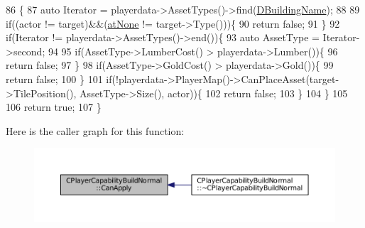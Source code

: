 \begin{DoxyCode}
86                                                                                                            
                                                        \{
87     \textcolor{keyword}{auto} Iterator = playerdata->AssetTypes()->find(\hyperlink{classCPlayerCapabilityBuildNormal_aae09d6cee5f8e201a0139c9065a5577c}{DBuildingName});
88     
89     \textcolor{keywordflow}{if}((actor != target)&&(\hyperlink{GameDataTypes_8h_a5600d4fc433b83300308921974477feca82fb51718e2c00981a2d37bc6fe92593}{atNone} != target->Type()))\{
90         \textcolor{keywordflow}{return} \textcolor{keyword}{false};
91     \}
92     \textcolor{keywordflow}{if}(Iterator != playerdata->AssetTypes()->end())\{
93         \textcolor{keyword}{auto} AssetType = Iterator->second;
94 
95         \textcolor{keywordflow}{if}(AssetType->LumberCost() > playerdata->Lumber())\{
96             \textcolor{keywordflow}{return} \textcolor{keyword}{false};   
97         \}
98         \textcolor{keywordflow}{if}(AssetType->GoldCost() > playerdata->Gold())\{
99             \textcolor{keywordflow}{return} \textcolor{keyword}{false};   
100         \}
101         \textcolor{keywordflow}{if}(!playerdata->PlayerMap()->CanPlaceAsset(target->TilePosition(), AssetType->Size(), actor))\{
102             \textcolor{keywordflow}{return} \textcolor{keyword}{false};
103         \}
104     \}
105 
106     \textcolor{keywordflow}{return} \textcolor{keyword}{true};
107 \}
\end{DoxyCode}
Here is the caller graph for this function\+:\nopagebreak
\begin{figure}[H]
\begin{center}
\leavevmode
\includegraphics[width=350pt]{classCPlayerCapabilityBuildNormal_a1a8c6fdd9d8a91ecb7417163279e2276_icgraph}
\end{center}
\end{figure}
\hypertarget{classCPlayerCapabilityBuildNormal_a5487e5521779846198604e8ebadaf283}{}\label{classCPlayerCapabilityBuildNormal_a5487e5521779846198604e8ebadaf283} 
